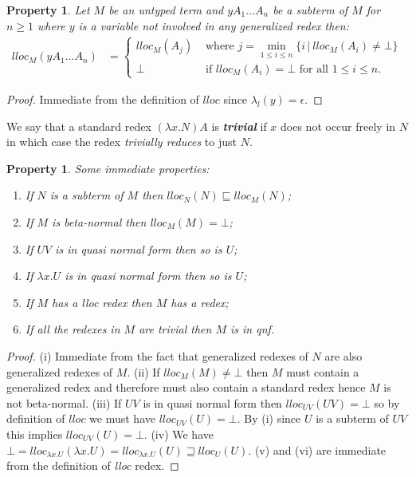 \documentclass[xchauthor,chkrefs,GCNS,amsmath,amsthm,rotating,leaveRGB]{tcsg}
\renewcommand{\index}[1]{}
\theoremstyle{plain}
\newtheorem{property}[theorem]{Property}
\theoremstyle{definition}
\begin{document}
\begin{property}\label{prop:qnf_longapply}
Let $M$ be an untyped term and $y A_{1} \ldots A_{n}$ be a subterm of $M$ for
$n\geq 1$ where $y$ is a variable not involved in any generalized redex then:
%
\begin{align*}
lloc_{M}(y A_{1} \ldots A_{n}) &=
\begin{cases}
lloc_{M} (A_{j}) &\mbox{ where } j = \min _{1\leq i\leq n} \{ i\, | \ lloc_{M} (A_{i}) \neq \bot \} \\
\bot &\mbox{ if } lloc_{M}(A_{i}) = \bot \mbox{ for all } 1\leq i\leq n.
\end{cases}
\end{align*}
\end{property}

\begin{proof}
Immediate from the definition of $lloc$ since $\lambda _{l}(y) = \epsilon $.
\end{proof}

We say that a standard redex $(\lambda x. N) A$ is
\textbf{\emph{trivial}}\index{trivial} if $x$ does not occur freely in $N$ in
which case the redex \emph{trivially reduces} to just $N$.

\begin{property}\label{prop:lloc_properties}
Some immediate properties:
%
\begin{enumerate}
\item[\textit{(i)}] If $N$ is a subterm of $M$ then $lloc_{N}(N) \sqsubseteq
    lloc_{M}(N)$;
%
\item[\textit{(ii)}] If $M$ is beta-normal then $lloc_{M}(M) = \bot $;
%
\item[\textit{(iii)}] If $U V$ is in quasi normal form then so is $U$;
%
\item[\textit{(iv)}] If $\lambda x . U$ is in quasi normal form then so is $U$;
%
\item[\textit{(v)}] If $M$ has a \emph{lloc} redex then $M$ has a redex;
%
\item[\textit{(vi)}] If all the redexes in $M$ are trivial then $M$ is in
    \emph{qnf}.
\end{enumerate}
\end{property}

\begin{proof}
(i) Immediate from the fact that generalized redexes of $N$ are also
generalized redexes of $M$. (ii) If $lloc_{M}(M) \neq \bot $ then $M$ must
contain a generalized redex and therefore must also contain a standard redex
hence $M$ is not beta-normal. (iii) If $U V$ is in quasi normal form then
$lloc_{UV}(UV) = \bot $ so by definition of $lloc$ we must have $lloc_{UV}(U)
= \bot $. By (i) since $U$ is a subterm of $UV$ this implies $lloc_{UV}(U) =
\bot $. (iv) We have $\bot = lloc_{\lambda x . U}(\lambda x . U) =
lloc_{\lambda x . U}(U) \sqsupseteq lloc_{U}(U)$. (v) and (vi) are immediate
from the definition of \emph{lloc} redex.
\end{proof}
\end{document}
